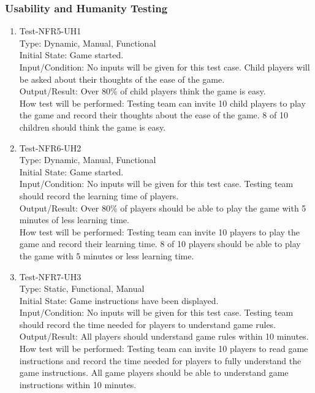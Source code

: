 \documentclass[12pt]{article}
\begin{document}
\subsubsection{Usability and Humanity Testing}
\begin{enumerate}[1.]
\item Test-NFR5-UH1\\
Type: Dynamic, Manual, Functional\\
Initial State: Game started.\\
Input/Condition: No inputs will be given for this test
case. Child players will be asked about their thoughts
of the ease of the game.\\
Output/Result: Over 80\% of child players think the game is easy.\\
How test will be performed: Testing team can invite
10 child players to play the game and record their 
thoughts about the ease of the game. 8 of 10 children
should think the game is easy.
\item Test-NFR6-UH2\\
Type: Dynamic, Manual, Functional\\
Initial State: Game started.\\
Input/Condition: No inputs will be given for this 
test case. Testing team should record the learning time
of players.\\
Output/Result: Over 80\% of players should be able to 
play the game with 5 minutes of less learning time.\\
How test will be performed:  Testing team can invite
10 players to play the game and record their learning time. 8 of 10 players should be able to play the game with 5 minutes or less learning time.
\item Test-NFR7-UH3\\
Type: Static, Functional, Manual\\
Initial State: Game instructions have been displayed.\\
Input/Condition: No inputs will be given for this test
case. Testing team should record the time needed for 
players to understand game rules.\\
Output/Result: All players should understand game rules
within 10 minutes.\\
How test will be performed:  Testing team can invite
10 players to read game instructions and record the time needed for players to fully understand the game instructions.
All game players should be able to understand game 
instructions within 10 minutes.
\end{enumerate}
\end{document}
